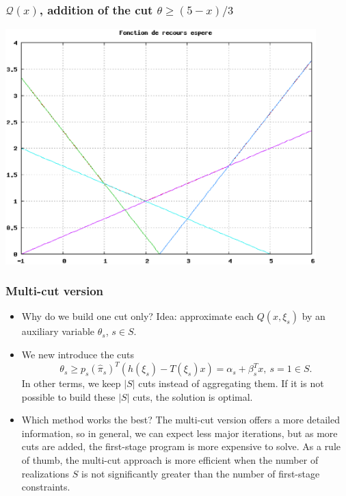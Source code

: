 \documentclass{beamer}
\begin{document}
\begin{frame}
\frametitle{$\mathcal{Q}(x)$, addition of the cut $\theta \geq (5-x)/3$}
	
\includegraphics[width=0.9\textwidth]{coupe_4.eps}
	
\end{frame}

\begin{frame}
\frametitle{Multi-cut version}

\begin{itemize}
	\item
	Why do we build one cut only?
	{\red Idea}: approximate {\blue each} $Q(x,\xi_s)$ by an auxiliary variable $\theta_s$, $s \in S$.
	\item
	We new introduce the cuts
	\[
	\theta_s \geq p_s(\hat{\pi}_s)^T(h(\xi_s) - T(\xi_s)x) = \alpha_s +
	\beta_s^Tx,\ s = 1 \in S.
	\]
	In other terms, we keep $|S|$ cuts instead of aggregating them.
	If it is not possible to build these $|S|$ cuts, the solution is optimal.
	\item
	Which method works the best?
	The multi-cut version offers a more detailed information, so in general, we can expect less major iterations, but as more cuts are added, the first-stage program is more expensive to solve.
	As a rule of thumb, the multi-cut approach is more efficient when the number of realizations $S$ is not significantly greater than the number of first-stage constraints.
\end{itemize}

\end{frame}
\end{document}

